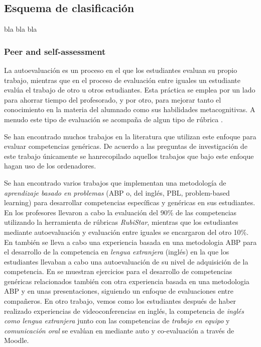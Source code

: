 \subsection{Esquema de clasificación}

bla bla bla

\subsubsection{Peer and self-assessment}

La autoevaluación es un proceso en el que los estudiantes evaluan su propio trabajo, mientras que  en el proceso de evaluación entre iguales un estudiante evalúa el trabajo de otro u otros estudiantes. Esta práctica se emplea por un lado para ahorrar tiempo del profesorado, y por otro, para mejorar tanto el conocimiento en la materia del alumnado como sus habilidades metacognitivas. A menudo este tipo de evaluación se acompaña de algun tipo de rúbrica \cite{malehorn1994ten}.

Se han encontrado muchos trabajos en la literatura que utilizan este enfoque para evaluar competencias genéricas. De acuerdo a las preguntas de investigación de este trabajo únicamente se hanrecopilado aquellos trabajos que bajo este enfoque hagan uso de los ordenadores.

Se han encontrado varios trabajos que implementan una metodología de \emph{aprendizaje basado en problemas} (ABP o, del inglés, PBL, problem-based learning) para desarrollar competencias específicas y genéricas en sus estudiantes. En \cite{lasa2013problem} los profesores llevaron a cabo la evaluación del 90\% de las competencias utilizando la herramienta de rúbricas \emph{RubiStar}, mientras que los estudiantes mediante autoevaluación y evaluación entre iguales se encargaron del otro 10\%. En \cite{renau2010teaching} también se lleva a cabo una experiencia basada en una metodologia ABP para el desarrollo de la competencia en \emph{lengua extranjera} (inglés) en la que los estudiantes llevaban a cabo una autoevaluación de su nivel de adquisición de la competencia. En \cite{johnson2002encouraging} se muestran ejercicios para el desarrollo de competencias genéricas relacionados también con otra experiencia basada en una metodologia ABP y en unas presentaciones, siguiendo un enfoque de evaluaciones entre compañeros. En otro trabajo, vemos como los estudiantes después de haber realizado experiencias de videoconferencias en inglés, la competencia de \emph{inglés como lengua extranjera} junto con las competencias de \emph{trabajo en equipo} y \emph{comunicación oral} se evalúan en \cite{masip2013self} mediante auto y co-evaluación a través de Moodle.


